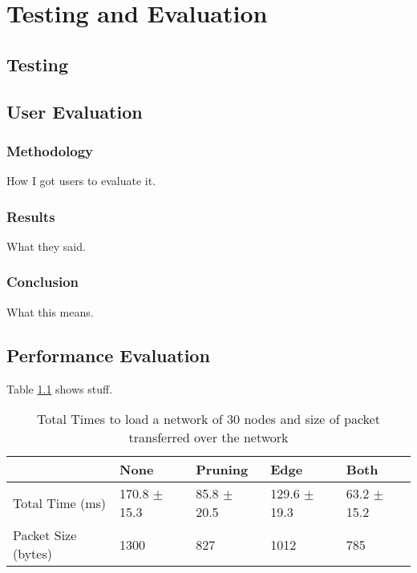 \documentclass[../dissertation.tex]{subfiles}
\begin{document}
\chapter{Testing and Evaluation}

\section{Testing}



\section{User Evaluation}

\subsection{Methodology}

How I got users to evaluate it.

\subsection{Results}

What they said.

\subsection{Conclusion}

What this means.

\section{Performance Evaluation}

Table \ref{table:30-nodes} shows stuff.

\begin{table}[ht]
\centering
\begin{tabular}{|l|l|l|l|l|}
\hline
                    & None           & Pruning       & Edge           & Both          \\ \hline
Total Time (ms)     & 170.8 $\pm$ 15.3 & 85.8 $\pm$ 20.5 & 129.6 $\pm$ 19.3 & 63.2 $\pm$ 15.2 \\ \hline
Packet Size (bytes) & 1300           & 827           & 1012           & 785           \\ \hline
\end{tabular}
\caption{Total Times to load a network of 30 nodes and size of packet transferred over the network}
\label{table:30-nodes}
\end{table}
\end{document}
